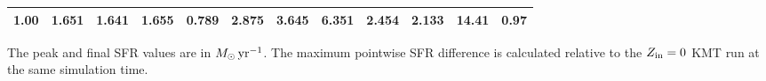 \documentclass[10pt,a4paper]{article}
\begin{document}
\begin{minipage}[t][0.92\textheight][c]{0.49\textwidth}
{\begin{minipage}{0.91\textheight}
{\begin{tabular}{
c
c
c
c
c
c
c
c
c
c
c
c
}
1.00 &
1.651 &
1.641 &
1.655 &
0.789 &
2.875 &
3.645 &
6.351 &
2.454 &
2.133 &
14.41 &
0.97
\\

\bottomrule

\end{tabular}
}

\vspace{0.18cm}

\begin{minipage}{0.96\linewidth}
\footnotesize
The peak and final SFR values are in
\(M_\odot\,{\rm yr}^{-1}\).
The maximum pointwise SFR difference is calculated relative to the
\(Z_{\rm in}=0\) KMT run at the same simulation time.
\end{minipage}

\end{minipage}
}

\end{minipage}
\hfill
\end{document}
